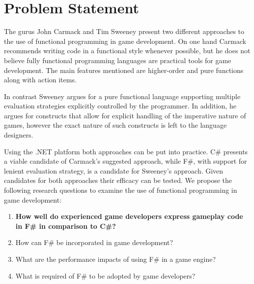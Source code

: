 \section{Problem Statement} \label{sec:problem_statement}
The gurus John Carmack and Tim Sweeney present two different approaches to the use of functional programming in game development. On one hand Carmack recommends writing code in a functional style whenever possible, but he does not believe fully functional programming languages are practical tools for game development. The main features mentioned are higher-order and pure functions along with action items.

In contrast Sweeney argues for a pure functional language supporting multiple evaluation strategies explicitly controlled by the programmer. In addition, he argues for constructs that allow for explicit handling of the imperative nature of games, however the exact nature of such constructs is left to the language designers.

Using the .NET platform both approaches can be put into practice. C\# presents a viable candidate of Carmack's suggested approach, while F\#, with support for lenient evaluation strategy, is a candidate for Sweeney's approach. Given candidates for both approaches their efficacy can be tested. We propose the following research questions to examine the use of functional programming in game development:


\begin{center}
    \begin{enumerate}
        \item \textbf{How well do experienced game developers express gameplay code in F\# in comparison to C\#?}
        \item How can F\# be incorporated in game development?
        \item What are the performance impacts of using F\# in a game engine?
        \item What is required of F\# to be adopted by game developers?
    \end{enumerate}
\end{center}

